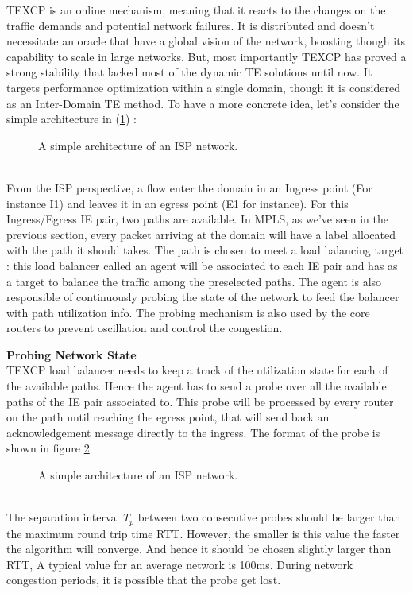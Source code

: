 TEXCP is an online mechanism, meaning that it reacts to the changes on the traffic demands and potential network failures. It is distributed and doesn't necessitate an oracle that have a global vision of the network, boosting though its capability to scale in large networks. But, most importantly TEXCP has proved a strong stability that lacked most of the dynamic TE solutions until now. 
It targets performance optimization within a single domain, though it is considered as an Inter-Domain TE method. To have a more concrete idea, let's consider the simple architecture in (\ref{fig:texcp1}) :
\begin{figure}[h]
 \begin{center}

\caption{
   A simple architecture of an ISP network.
    \label{fig:texcp1}
}
\end{center}
\end{figure}
\\ From the ISP perspective, a flow enter the domain in an Ingress point (For instance I1) and leaves it in an egress point (E1 for instance). For this Ingress/Egress IE pair, two paths are available. In MPLS, as we've seen in the previous section, every packet arriving at the  domain will have a label allocated with the path it should takes. The path is chosen to meet a load balancing target : this load balancer called an agent will be associated to each IE pair and has as a target to balance the traffic among the preselected paths. The agent is also responsible of continuously probing the state of the network to feed the balancer with path utilization info. The probing mechanism is also used by the core routers to prevent oscillation and control the congestion.

{\bf Probing Network State}
\\ TEXCP load balancer needs to keep a track of the utilization state for each of the available paths. Hence the agent has to send a probe over all the available paths of  the IE pair associated to.  This probe will be processed by every router on the path until reaching the egress point, that will send back an acknowledgement message directly to the ingress. The format of the probe is shown in figure \ref{fig:texcp2}
\begin{figure}[h]
 \begin{center}
\caption{
   A simple architecture of an ISP network.
    \label{fig:texcp2}
}
\end{center}
\end{figure}
\\ The separation interval $T_p$ between two consecutive probes should be larger than the maximum round trip time RTT. However, the smaller is this value the faster the algorithm will converge. And hence it should be chosen slightly larger than RTT, A typical value for an average network is 100ms. During network congestion periods, it is possible that the probe get lost.

